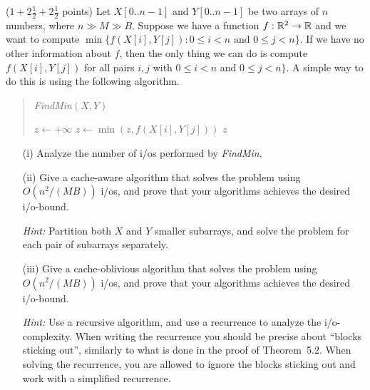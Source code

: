 \documentclass{article}
\newcommand{\Reals}{{\Bbb R}}
\renewcommand{\leq}{\leqslant}
\newcommand{\io}{{\sc i/o}\xspace}
\newcommand{\ios}{{\io}s\xspace}
\newcounter{rcounter}
\newenvironment{rlist}%
{\begin{list}{\setnr-\arabic{rcounter}}{\usecounter{rcounter}}}{\end{list}}
\begin{document}
\begin{rlist}
        
        \item ($1+2\frac{1}{2}+2\frac{1}{2}$ points)
        Let $X[0..n-1]$ and $Y[0..n-1]$ be two arrays of $n$ numbers, where $n \gg M \gg B$. Suppose we have a function $f:\Reals^2\rightarrow \Reals$ and we want to compute $\min \{ f(X[i],Y[j]) : 0\leq i <n \mbox{ and } 0\leq j <n \}$. If we have no other information about $f$, then the only thing we can do is compute $f(X[i],Y[j])$ for all pairs $i,j$ with $0\leq i <n$ and $0\leq j <n \}$. A simple way to do this is using the following algorithm.
        \begin{quotation}
            \noindent
            \emph{FindMin}$(X,Y)$ \\[-5mm]
            \begin{algorithmic}[1]
                \State $z \gets +\infty$
                \State $z \gets \min ( z, f(X[i],Y[j]) )$
                \EndFor
                \EndFor
                \State \Return $z$
            \end{algorithmic}
        \end{quotation}
        \begin{enumerate}
            \item[(i)]
            Analyze the number of \ios performed by \emph{FindMin}.
            \item[(ii)]
            Give a cache-aware algorithm that solves the problem using $O(n^2/(MB))$ \ios, and prove that your algorithms achieves the desired \io-bound.
            
            \emph{Hint:} Partition both $X$ and $Y$ smaller subarrays, and solve the problem for each pair of subarrays separately.
            \item[(iii)]
            Give a cache-oblivious algorithm that solves the problem using $O(n^2/(MB))$ \ios, and prove that your algorithms achieves the desired \io-bound.
            
            \emph{Hint:} Use a recursive algorithm, and use a recurrence to analyze the \io-complexity. When writing the recurrence you should be precise about ``blocks sticking out'', similarly to what is done in the proof of Theorem~5.2. When solving the recurrence, you are allowed to ignore the blocks sticking out and work with a simplified recurrence.
        \end{enumerate}
        

\end{rlist}
\end{document}
